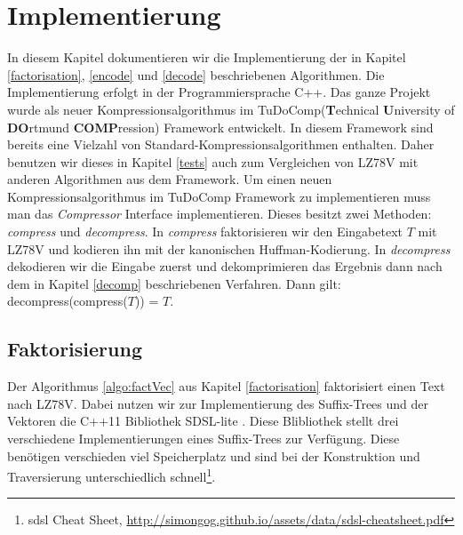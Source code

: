 \documentclass[a4paper,11pt]{scrartcl}%
\theoremstyle{change}
\theoremstyle{nonumberplain}
\theoremstyle{change}
\theoremstyle{nonumberplain}
\theoremstyle{change}
\theoremstyle{nonumberplain}
\begin{document}
\section{Implementierung}\label{impl}

In diesem Kapitel dokumentieren wir die Implementierung der in Kapitel \ref{factorisation}, \ref{encode} und \ref{decode} beschriebenen Algorithmen. 
\newline
Die Implementierung erfolgt in der Programmiersprache C++. Das ganze Projekt wurde als neuer Kompressionsalgorithmus im TuDoComp(\textbf{T}echnical \textbf{U}niversity of \textbf{DO}rtmund \textbf{COMP}ression) Framework entwickelt. In diesem Framework sind bereits eine Vielzahl von Standard-Kompressionsalgorithmen enthalten. Daher benutzen wir dieses in Kapitel \ref{tests} auch zum Vergleichen von LZ78V mit anderen Algorithmen aus dem Framework.
\newline
\newline
Um einen neuen Kompressionsalgorithmus im TuDoComp Framework zu implementieren muss man das \textit{Compressor} Interface implementieren. Dieses besitzt zwei Methoden: \textit{compress} und \textit{decompress}. In \textit{compress} faktorisieren wir den Eingabetext $T$ mit LZ78V und kodieren ihn mit der kanonischen Huffman-Kodierung.
In \textit{decompress} dekodieren wir die Eingabe zuerst und dekomprimieren das Ergebnis dann nach dem in Kapitel \ref{decomp} beschriebenen Verfahren.
Dann gilt: decompress(compress($T$)) = $T$.

\subsection{Faktorisierung}

Der Algorithmus \ref{algo:factVec} aus Kapitel \ref{factorisation} faktorisiert einen Text nach LZ78V. Dabei nutzen wir zur Implementierung des Suffix-Trees und der Vektoren die C++11 Bibliothek SDSL-lite \cite{sdsl}. 
\newline
Diese Blibliothek stellt drei verschiedene Implementierungen eines Suffix-Trees zur Verfügung. Diese benötigen verschieden viel Speicherplatz und sind bei der Konstruktion und Traversierung unterschiedlich schnell\footnote{\label{footnote:sdsl}sdsl Cheat Sheet, \url{http://simongog.github.io/assets/data/sdsl-cheatsheet.pdf}}.
\end{document}
